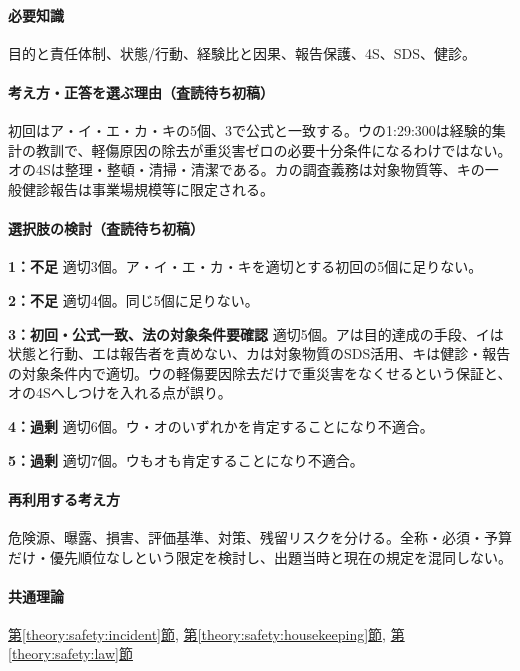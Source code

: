 \paragraph{必要知識} 目的と責任体制、状態/行動、経験比と因果、報告保護、4S、SDS、健診。

\paragraph{考え方・正答を選ぶ理由（査読待ち初稿）} 初回はア・イ・エ・カ・キの5個、3で公式と一致する。ウの1:29:300は経験的集計の教訓で、軽傷原因の除去が重災害ゼロの必要十分条件になるわけではない。オの4Sは整理・整頓・清掃・清潔である。カの調査義務は対象物質等、キの一般健診報告は事業場規模等に限定される。

\paragraph{選択肢の検討（査読待ち初稿）}\mbox{}\par

\noindent\textbf{1：不足} 適切3個。ア・イ・エ・カ・キを適切とする初回の5個に足りない。\par

\noindent\textbf{2：不足} 適切4個。同じ5個に足りない。\par

\noindent\textbf{3：初回・公式一致、法の対象条件要確認} 適切5個。アは目的達成の手段、イは状態と行動、エは報告者を責めない、カは対象物質のSDS活用、キは健診・報告の対象条件内で適切。ウの軽傷要因除去だけで重災害をなくせるという保証と、オの4Sへしつけを入れる点が誤り。\par

\noindent\textbf{4：過剰} 適切6個。ウ・オのいずれかを肯定することになり不適合。\par

\noindent\textbf{5：過剰} 適切7個。ウもオも肯定することになり不適合。\par

\paragraph{再利用する考え方} 危険源、曝露、損害、評価基準、対策、残留リスクを分ける。全称・必須・予算だけ・優先順位なしという限定を検討し、出題当時と現在の規定を混同しない。

\paragraph{共通理論} \hyperref[theory:safety:incident]{第\ref*{theory:safety:incident}節}, \hyperref[theory:safety:housekeeping]{第\ref*{theory:safety:housekeeping}節}, \hyperref[theory:safety:law]{第\ref*{theory:safety:law}節}

